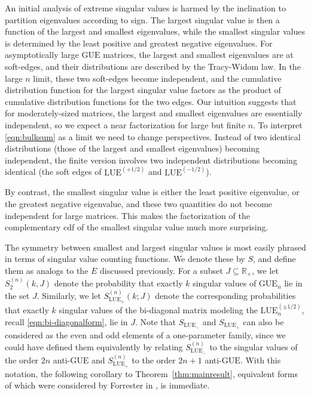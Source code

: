 \documentclass[pdftex, oneside, 10pt, letterpaper]{amsart}
\theoremstyle{plain}
\theoremstyle{definition}
\theoremstyle{remark}
\begin{document}
An initial analysis of extreme singular values is harmed by the
inclination to partition eigenvalues according to sign.  The largest
singular value is then a function of the largest and smallest
eigenvalues, while the smallest singular values is determined by the
least positive and greatest negative eigenvalues.  For asymptotically
large {\ensuremath{\mathrm{GUE}}}{} matrices, the largest and smallest eigenvalues are at
soft-edges, and their distributions are described by the Tracy-Widom
law.  In the large $n$ limit, these two soft-edges become independent,
and the cumulative distribution function for the largest singular
value factors as the product of cumulative distribution functions for
the two edges.  Our intuition suggests that for moderately-sized
matrices, the largest and smallest eigenvalues are essentially
independent, so we expect a near factorization for large but finite
$n$.  To interpret \eqref{eqn:bulksum} as a limit we need to change
perspectives.  Instead of two identical distributions (those of the
largest and smallest eigenvalues) becoming independent, the finite
version involves two independent distributions becoming identical (the
soft edges of ${\ensuremath{\mathrm{LUE}}}^{(+1/2)}$ and ${\ensuremath{\mathrm{LUE}}}^{(-1/2)}$).

By contrast, the smallest singular value is either the least
positive eigenvalue, or the greatest negative eigenvalue, and these
two quantities do not become independent for large matrices.  This
makes the factorization of the complementary cdf of the smallest
singular value much more surprising.

The symmetry between smallest and largest singular values is most
easily phrased in terms of singular value counting functions.  We
denote these by $S$, and define them as analogs to the $E$ discussed
previously.  For a subset $J\subseteq\mathbb{R}_+$, we let
$S_2^{(n)}(k,J)$ denote the probability that exactly $k$ singular
values of ${\ensuremath{\mathrm{GUE}}}_n$ lie in the set $J$.  Similarly, we let
$S_{{\ensuremath{\mathrm{LUE}}}_{\pm}}^{(n)}(k;J)$ denote the corresponding probabilities
that exactly $k$ singular values of the bi-diagonal matrix modeling
the ${\ensuremath{\mathrm{LUE}}}_n^{(\pm1/2)}$, recall \eqref{eqn:bi-diagonalform}, lie in
$J$.  Note that $S_{{\ensuremath{\mathrm{LUE}}}_-}$ and $S_{{\ensuremath{\mathrm{LUE}}}_+}$ can also be considered
as the even and odd elements of a one-parameter family, since we could
have defined them equivalently by relating $S_{{\ensuremath{\mathrm{LUE}}}_-}^{(n)}$ to the
singular values of the order $2n$ anti-${\ensuremath{\mathrm{GUE}}}{}$ and $S_{{\ensuremath{\mathrm{LUE}}}_+}^{(n)}$
to the order $2n+1$ anti-${\ensuremath{\mathrm{GUE}}}{}$.  With this notation, the following
corollary to Theorem~\ref{thm:mainresult}, equivalent forms of which
were considered by Forrester in \cite{Forrester-Evenness}, is
immediate.
\end{document}
